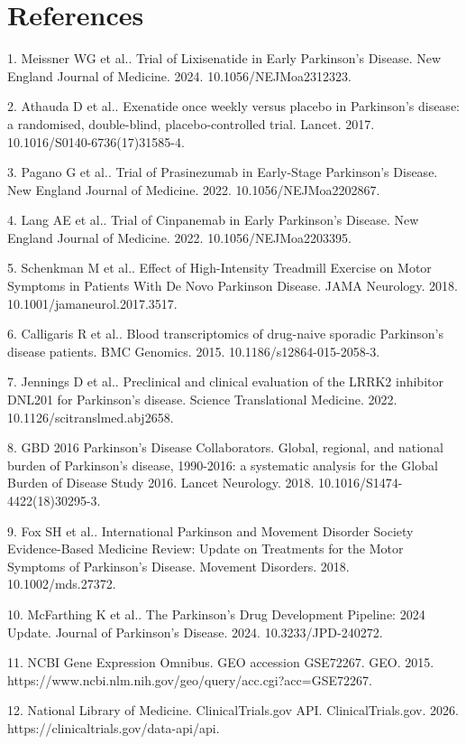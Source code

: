 \documentclass{article}
\begin{document}
\section{References}

1. Meissner WG et al.. Trial of Lixisenatide in Early Parkinson's Disease. New England Journal of Medicine. 2024. 10.1056/NEJMoa2312323.

2. Athauda D et al.. Exenatide once weekly versus placebo in Parkinson's disease: a randomised, double-blind, placebo-controlled trial. Lancet. 2017. 10.1016/S0140-6736(17)31585-4.

3. Pagano G et al.. Trial of Prasinezumab in Early-Stage Parkinson's Disease. New England Journal of Medicine. 2022. 10.1056/NEJMoa2202867.

4. Lang AE et al.. Trial of Cinpanemab in Early Parkinson's Disease. New England Journal of Medicine. 2022. 10.1056/NEJMoa2203395.

5. Schenkman M et al.. Effect of High-Intensity Treadmill Exercise on Motor Symptoms in Patients With De Novo Parkinson Disease. JAMA Neurology. 2018. 10.1001/jamaneurol.2017.3517.

6. Calligaris R et al.. Blood transcriptomics of drug-naive sporadic Parkinson's disease patients. BMC Genomics. 2015. 10.1186/s12864-015-2058-3.

7. Jennings D et al.. Preclinical and clinical evaluation of the LRRK2 inhibitor DNL201 for Parkinson's disease. Science Translational Medicine. 2022. 10.1126/scitranslmed.abj2658.

8. GBD 2016 Parkinson's Disease Collaborators. Global, regional, and national burden of Parkinson's disease, 1990-2016: a systematic analysis for the Global Burden of Disease Study 2016. Lancet Neurology. 2018. 10.1016/S1474-4422(18)30295-3.

9. Fox SH et al.. International Parkinson and Movement Disorder Society Evidence-Based Medicine Review: Update on Treatments for the Motor Symptoms of Parkinson's Disease. Movement Disorders. 2018. 10.1002/mds.27372.

10. McFarthing K et al.. The Parkinson's Drug Development Pipeline: 2024 Update. Journal of Parkinson's Disease. 2024. 10.3233/JPD-240272.

11. NCBI Gene Expression Omnibus. GEO accession GSE72267. GEO. 2015. https://www.ncbi.nlm.nih.gov/geo/query/acc.cgi?acc=GSE72267.

12. National Library of Medicine. ClinicalTrials.gov API. ClinicalTrials.gov. 2026. https://clinicaltrials.gov/data-api/api.
\end{document}
